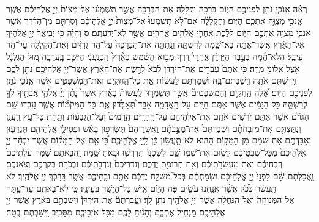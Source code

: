 \documentclass[twoside, openany, parskip=half, 11pt]{book}
\begin{document}
\begin{footnotesize}
\begin{multicols}{2}
\\
 רְאֵ֗ה אָֽנֹכִ֛י נֹתֵ֥ן לִפְנֵיכֶ֖ם הַיּ֑וֹם בְּרָכָ֖ה וּקְלָלָֽה׃ אֶת־הַבְּרָכָ֑ה אֲשֶׁ֣ר תִּשְׁמְע֗וּ אֶל־מִצְוֹת֙ יְיָ֣ אֱלֹֽהֵיכֶ֔ם אֲשֶׁ֧ר אָֽנֹכִ֛י מְצַוֶּ֥ה אֶתְכֶ֖ם הַיּֽוֹם׃ וְהַקְּלָלָ֗ה אִם־לֹ֤א תִשְׁמְעוּ֙ אֶל־מִצְוֹת֙ יְיָ֣ אֱלֹֽהֵיכֶ֔ם וְסַרְתֶּ֣ם מִן־הַדֶּ֔רֶךְ אֲשֶׁ֧ר אָֽנֹכִ֛י מְצַוֶּ֥ה אֶתְכֶ֖ם הַיּ֑וֹם לָלֶ֗כֶת אַֽחֲרֵ֛י אֱלֹהִ֥ים אֲחֵרִ֖ים אֲשֶׁ֥ר לֹֽא־יְדַעְתֶּֽם׃ \textbf{ס} וְהָיָ֗ה כִּ֤י יְבִֽיאֲךָ֙ יְיָ֣ אֱלֹהֶ֔יךָ אֶל־הָאָ֕רֶץ אֲשֶׁר־אַתָּ֥ה בָא־שָׁ֖מָּה לְרִשְׁתָּ֑הּ וְנָֽתַתָּ֤ה אֶת־הַבְּרָכָה֙ עַל־הַ֣ר גְּרִזִּ֔ים וְאֶת־הַקְּלָלָ֖ה עַל־הַ֥ר עֵיבָֽל׃ הֲלֹא־הֵ֜מָּה בְּעֵ֣בֶר הַיַּרְדֵּ֗ן אַֽחֲרֵי֙ דֶּ֚רֶךְ מְב֣וֹא הַשֶּׁ֔מֶשׁ בְּאֶ֨רֶץ֙ הַֽכְּנַֽעֲנִ֔י הַיּשֵׁ֖ב בָּֽעֲרָבָ֑ה מ֚וּל הַגִּלְגָּ֔ל אֵ֖צֶל אֵֽלוֹנֵ֥י מֹרֶֽה׃ כִּ֤י אַתֶּם֙ עֹֽבְרִ֣ים אֶת־הַיַּרְדֵּ֔ן לָבֹא֙ לָרֶ֣שֶׁת אֶת־הָאָ֔רֶץ אֲשֶׁר־יְיָ֥ אֱלֹֽהֵיכֶ֖ם נֹתֵ֣ן לָכֶ֑ם וִֽירִשְׁתֶּ֥ם אֹתָ֖הּ וִֽישַׁבְתֶּם־בָּֽהּ׃ 
 וּשְׁמַרְתֶּ֣ם לַֽעֲשׂ֔וֹת אֵ֥ת כָּל־הַֽחֻקִּ֖ים וְאֶת־הַמִּשְׁפָּטִ֑ים אֲשֶׁ֧ר אָֽנֹכִ֛י נֹתֵ֥ן לִפְנֵיכֶ֖ם הַיּֽוֹם׃ 
 אֵ֠לֶּה הַֽחֻקִּ֣ים וְהַמִּשְׁפָּטִים֘ אֲשֶׁ֣ר תִּשְׁמְר֣וּן לַֽעֲשׂוֹת֒ בָּאָ֕רֶץ אֲשֶׁר֩ נָתַ֨ן יְיָ֜ אֱלֹהֵ֧י אֲבֹתֶ֛יךָ לְךָ֖ לְרִשְׁתָּ֑הּ כָּל־הַיָּמִ֔ים אֲשֶׁר־אַתֶּ֥ם חַיִּ֖ים עַל־הָֽאֲדָמָֽה׃ אַבֵּ֣ד תְּ֠אַבְּד֠וּן אֶֽת־כָּל־הַמְּקֹמ֞וֹת אֲשֶׁ֧ר עָֽבְדוּ־שָׁ֣ם הַגּוֹיִ֗ם אֲשֶׁ֥ר אַתֶּ֛ם יֹֽרְשִׁ֥ים אֹתָ֖ם אֶת־אֱלֹֽהֵיהֶ֑ם עַל־הֶֽהָרִ֤ים הָֽרָמִים֙ וְעַל־הַגְּבָע֔וֹת וְתַ֖חַת כָּל־עֵ֥ץ רַֽעֲנָֽן׃ וְנִתַּצְתֶּ֣ם אֶת־מִזְבְּחֹתָ֗ם וְשִׁבַּרְתֶּם֙ אֶת־מַצֵּ֣בֹתָ֔ם וַֽאֲשֵֽׁרֵיהֶם֙ תִּשְׂרְפ֣וּן בָּאֵ֔שׁ וּפְסִילֵ֥י אֱלֹֽהֵיהֶ֖ם תְּגַדֵּע֑וּן וְאִבַּדְתֶּ֣ם אֶת־שְׁמָ֔ם מִן־הַמָּק֖וֹם הַהֽוּא׃ לֹא־תַֽעֲשׂ֣וּן כֵּ֔ן לַֽיְיָ֖ אֱלֹֽהֵיכֶֽם׃ כִּ֠י אִֽם־אֶל־הַמָּק֞וֹם אֲשֶׁר־יִבְחַ֨ר יְיָ֤ אֱלֹֽהֵיכֶם֙ מִכָּל־שִׁבְטֵיכֶ֔ם לָשׂ֥וּם אֶת־שְׁמ֖וֹ שָׁ֑ם לְשִׁכְנ֥וֹ תִדְרְשׁ֖וּ וּבָ֥אתָ שָּֽׁמָּה׃  וַֽהֲבֵאתֶ֣ם שָׁ֗מָּה עֹלֹֽתֵיכֶם֙ וְזִבְחֵיכֶ֔ם וְאֵת֙ מַעְשְׂרֹ֣תֵיכֶ֔ם וְאֵ֖ת תְּרוּמַ֣ת יֶדְכֶ֑ם וְנִדְרֵיכֶם֙ וְנִדְבֹ֣תֵיכֶ֔ם וּבְכֹרֹ֥ת בְּקַרְכֶ֖ם וְצֹֽאנְכֶֽם׃ וַֽאֲכַלְתֶּם־שָׁ֗ם לִפְנֵי֙ יְיָ֣ אֱלֹֽהֵיכֶ֔ם וּשְׂמַחְתֶּ֗ם בְּכֹל֙ מִשְׁלַ֣ח יֶדְכֶ֔ם אַתֶּ֖ם וּבָֽתֵּיכֶ֑ם אֲשֶׁ֥ר בֵּֽרַכְךָ֖ יְיָ֥ אֱלֹהֶֽיךָ׃ לֹ֣א תַֽעֲשׂ֔וּן כְּ֠כֹ֠ל אֲשֶׁ֨ר אֲנַ֧חְנוּ עֹשִׂ֛ים פֹּ֖ה הַיּ֑וֹם אִ֖ישׁ כָּל־הַיָּשָׁ֥ר בְּעֵינָֽיו׃ כִּ֥י לֹֽא־בָאתֶ֖ם עַד־עָ֑תָּה אֶל־הַמְּנוּחָה֙ וְאֶל־הַֽנַּֽחֲלָ֔ה אֲשֶׁר־יְיָ֥ אֱלֹהֶ֖יךָ נֹתֵ֥ן לָֽךְ׃ וַֽעֲבַרְתֶּם֘ אֶת־הַיַּרְדֵּן֒ וִֽישַׁבְתֶּ֣ם בָּאָ֔רֶץ אֲשֶׁר־יְיָ֥ אֱלֹֽהֵיכֶ֖ם מַנְחִ֣יל אֶתְכֶ֑ם וְהֵנִ֨יחַ לָכֶ֧ם מִכָּל־אֹֽיְבֵיכֶ֛ם מִסָּבִ֖יב וִֽישַׁבְתֶּם־בֶּֽטַח׃


\end{multicols}
\end{footnotesize}
\end{document}

